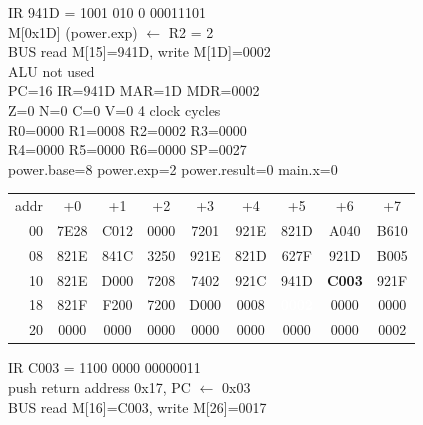 \noindent\begin{tcolorbox}[stepbox, title={Step 6 \hfill PC 15 \quad ST R2, power.exp}]
\textcolor{dim}{IR} 941D = 1001 010 0 00011101\\
M[0x1D] (power.exp) $\leftarrow$ R2 = 2\\
\textcolor{dim}{BUS} read M[15]=941D, \textcolor{wrt}{write M[1D]=0002}\\
\textcolor{dim}{ALU} \textcolor{dim}{not used}\\
PC=16 IR=941D MAR=1D MDR=0002\\
Z=0 N=0 C=0 V=0 \hfill \textcolor{dim}{4 clock cycles}\\
R0=0000 R1=0008 R2=0002 R3=0000\\
R4=0000 R5=0000 R6=0000 SP=0027\\
\textcolor{dim}{power.base=8  power.exp=2  power.result=0  main.x=0}\\[1pt]
{\setlength{\tabcolsep}{1.6pt}\begin{tabular}{@{}r*{8}{c}@{}}
\textcolor{dim}{addr} & \textcolor{dim}{+0} & \textcolor{dim}{+1} & \textcolor{dim}{+2} & \textcolor{dim}{+3} & \textcolor{dim}{+4} & \textcolor{dim}{+5} & \textcolor{dim}{+6} & \textcolor{dim}{+7}\\
\textcolor{dim}{00} & 7E28 & C012 & 0000 & 7201 & 921E & 821D & A040 & B610\\
\textcolor{dim}{08} & 821E & 841C & 3250 & 921E & 821D & 627F & 921D & B005\\
\textcolor{dim}{10} & 821E & D000 & 7208 & 7402 & 921C & 941D & \cellcolor{pcc}\textbf{C003} & 921F\\
\textcolor{dim}{18} & 821F & F200 & 7200 & D000 & \cellcolor{datac}0008 & \cellcolor{wrt}\textcolor{white}{\textbf{0002}} & \cellcolor{datac}0000 & \cellcolor{datac}0000\\
\textcolor{dim}{20} & \cellcolor{stackc}0000 & \cellcolor{stackc}0000 & \cellcolor{stackc}0000 & \cellcolor{stackc}0000 & \cellcolor{stackc}0000 & \cellcolor{stackc}0000 & \cellcolor{stackc}0000 & \cellcolor{stackc}0002\\
\end{tabular}}
\end{tcolorbox}\hfill\begin{tcolorbox}[stepbox, title={Step 7 \hfill PC 16 \quad CALL power}]
\textcolor{dim}{IR} C003 = 1100 0000 00000011\\
push return address 0x17, PC $\leftarrow$ 0x03\\
\textcolor{dim}{BUS} read M[16]=C003, \textcolor{wrt}{write M[26]=0017}\\

\end{tcolorbox}
